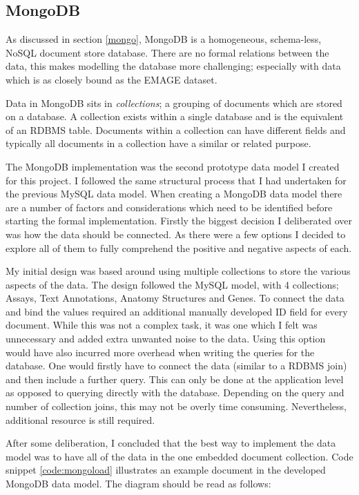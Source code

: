 \subsection{MongoDB}\label{mongodesign}

As discussed in section \ref{mongo}, MongoDB is a homogeneous, schema-less, NoSQL document store database. There are no formal relations between the data, this makes modelling the database more challenging; especially with data which is as closely bound as the EMAGE dataset.

Data in MongoDB sits in \textit{collections}; a grouping of documents which are stored on a database. A collection exists within a single database and is the equivalent of an RDBMS table. Documents within a collection can have different fields and typically all documents in a collection have a similar or related purpose. 

The MongoDB implementation was the second prototype data model I created for this project. I followed the same structural process that I had undertaken for the previous MySQL data model. When creating a MongoDB data model there are a number of factors and considerations which need to be identified before starting the formal implementation. Firstly the biggest decision I deliberated over was how the data should be connected. As there were a few options I decided to explore all of them to fully comprehend the positive and negative aspects of each.

My initial design was based around using multiple collections to store the various aspects of the data. The design followed the MySQL model, with 4 collections; Assays, Text Annotations, Anatomy Structures and Genes. To connect the data and bind the values required an additional manually developed ID field for every document. While this was not a complex task, it was one which I felt was unnecessary and added extra unwanted noise to the data. Using this option would have also incurred more overhead when writing the queries for the database. One would firstly have to connect the data (similar to a RDBMS join) and then include a further query. This can only be done at the application level as opposed to querying directly with the database. Depending on the query and number of collection joins, this may not be overly time consuming. Nevertheless, additional resource is still required. 

After some deliberation, I concluded that the best way to implement the data model was to have all of the data in the one embedded document collection. Code snippet \ref{code:mongoload} illustrates an example document in the developed MongoDB data model. The diagram should be read as follows:

